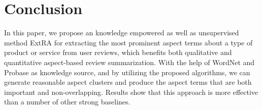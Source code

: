 \section{Conclusion}
\label{sec:conclusion}

In this paper, we propose an knowledge empowered
as well as unsupervised method ExtRA for 
extracting the most prominent aspect terms about a type of product 
or service from user reviews, which benefits both qualitative and 
quantitative aspect-based review summarization.
With the help of WordNet and Probase as knowledge source, 
and by utilizing the proposed algorithms, 
we can generate reasonable aspect clusters 
and produce the aspect terms that are both important
and non-overlapping. 
Results show that this approach is more
effective than a number of other strong baselines.

